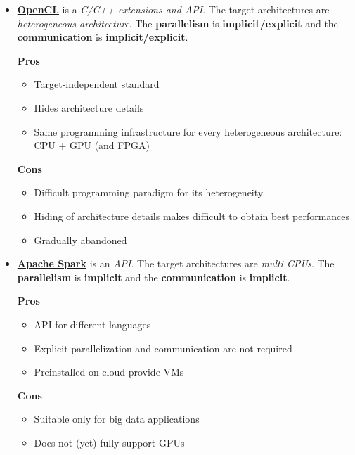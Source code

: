 \begin{itemize}
    \item \textbf{\underline{OpenCL}} is a \emph{C/C++ extensions and API}. The target architectures are \emph{heterogeneous architecture}. The \textbf{parallelism} is \textbf{implicit/explicit} and the \textbf{communication} is \textbf{implicit/explicit}.
    \begin{flushleft}
        \textcolor{Green3}{ \textbf{Pros}}
    \end{flushleft}
    \begin{itemize}
        \item Target-independent standard
        \item Hides architecture details
        \item Same programming infrastructure for every heterogeneous architecture: CPU + GPU (and FPGA)
    \end{itemize}
    \begin{flushleft}
        \textcolor{Red2}{ \textbf{Cons}}
    \end{flushleft}
    \begin{itemize}
        \item Difficult programming paradigm for its heterogeneity
        \item Hiding of architecture details makes difficult to obtain best performances
        \item Gradually abandoned
    \end{itemize}

    \item \textbf{\underline{Apache Spark}} is an \emph{API}. The target architectures are \emph{multi CPUs}. The \textbf{parallelism} is \textbf{implicit} and the \textbf{communication} is \textbf{implicit}.
    \begin{flushleft}
        \textcolor{Green3}{ \textbf{Pros}}
    \end{flushleft}
    \begin{itemize}
        \item API for different languages
        \item Explicit parallelization and communication are not required
        \item Preinstalled on cloud provide VMs
    \end{itemize}
    \begin{flushleft}
        \textcolor{Red2}{ \textbf{Cons}}
    \end{flushleft}
    \begin{itemize}
        \item Suitable only for big data applications
        \item Does not (yet) fully support GPUs
    \end{itemize}
\end{itemize}
